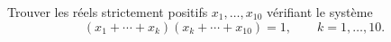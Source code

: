 Trouver les réels strictement positifs $x_1, \ldots, x_{10}$ vérifiant le système
\[ (x_1 + \cdots + x_k)(x_k + \cdots + x_{10}) = 1,\qquad k = 1, \ldots, 10. \]
